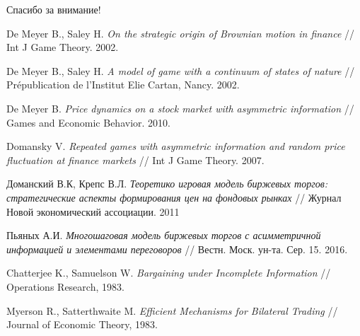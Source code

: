 \documentclass[12pt]{beamer}
\begin{document}

\begin{frame}
\begin{center}
Спасибо за внимание!
\end{center}
\end{frame}

\begin{thebibliography}{99}
  De Meyer B., Saley H. \emph{On the strategic origin of Brownian motion in
    finance} // Int J Game Theory. 2002.
 
%
  De Meyer B., Saley H. \emph{A model of game with a continuum of states of
    nature} // Pr\'{e}publication de l’Institut Elie Cartan, Nancy. 2002.
  
%
  De Meyer B. \emph{Price dynamics on a stock market with asymmetric
    information} // Games and Economic Behavior. 2010.
  
%
  Domansky V. \emph{Repeated games with asymmetric information and random price
  fluctuation at finance markets} // Int J Game Theory. 2007.

%
  Доманский В.К, Крепс В.Л. \emph{Теоретико игровая модель биржевых торгов:
    стратегические аспекты формирования цен на фондовых рынках} // Журнал Новой
  экономический ассоциации. 2011

%
  Пьяных А.И. \emph{Многошаговая модель биржевых торгов с асимметричной
    информацией и элементами переговоров} // Вестн. Моск. ун-та. Сер. 15. 2016.
  
%
  Chatterjee K., Samuelson W. \emph{Bargaining under Incomplete Information} //
  Operations Research, 1983.
  
%
  Myerson R., Satterthwaite M. \emph{Efficient Mechanisms for Bilateral Trading}
  // Journal of Economic Theory, 1983.

\end{thebibliography}
\end{document}
